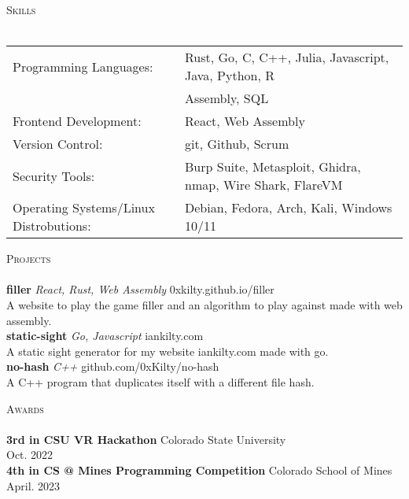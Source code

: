 \documentclass[a4paper]{article}
\newcommand{\lineunder} {
    \vspace*{-8pt} \\
    \hspace*{-18pt} \hrulefill \\
}
\newcommand{\header} [1] {
    {\hspace*{-18pt}\vspace*{6pt} \textsc{#1}}
    \vspace*{-6pt} \lineunder
}
\begin{document}
\header{Skills}
\begin{tabular}{ l l }
	Programming Languages:                 & Rust, Go, C, C++, Julia, Javascript, Java, Python, R\\
                                           & Assembly, SQL \\
	Frontend Development:                  & React, Web Assembly \\
	Version Control:                       & git, Github, Scrum \\
    Security Tools:                        & Burp Suite, Metasploit, Ghidra, nmap, Wire Shark, FlareVM \\
	Operating Systems/Linux Distrobutions: & Debian, Fedora, Arch, Kali, Windows 10/11 \\
\end{tabular}
\vspace{2mm}

\header{Projects}
{\textbf{filler}} {\sl React, Rust, Web Assembly} \hfill 0xkilty.github.io/filler\\
A website to play the game \textquotedbl{}filler\textquotedbl{} and an algorithm to play against made with web assembly.\\
\vspace*{2mm}
{\textbf{static-sight}} {\sl Go, Javascript} \hfill iankilty.com\\
A static sight generator for my website iankilty.com made with go.\\
\vspace*{2mm}
{\textbf{no-hash}} {\sl C++} \hfill github.com/0xKilty/no-hash\\
A C++ program that duplicates itself with a different file hash.\\
\vspace*{2mm}

\header{Awards}
\textbf{3rd in CSU VR Hackathon} \hfill Colorado State University\\
\hfill Oct. 2022\\
\vspace*{2mm}
\textbf{4th in CS @ Mines Programming Competition} \hfill Colorado School of Mines\\
\hfill April. 2023\\
\vspace*{2mm}
\end{document}

